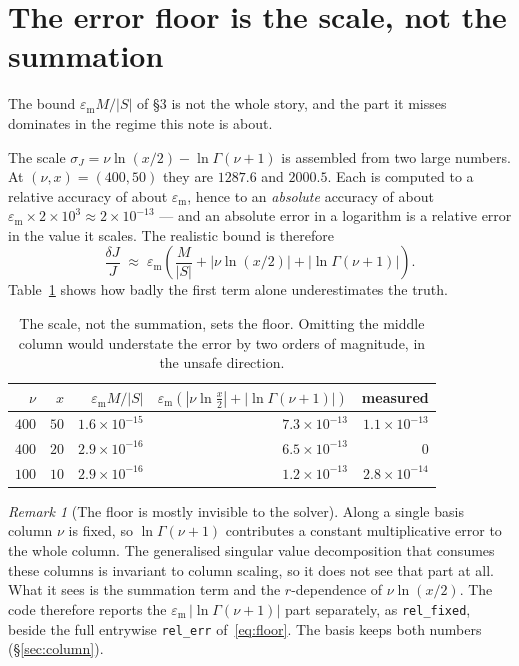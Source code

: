 \documentclass[11pt]{article}
\theoremstyle{remark}
\newtheorem{remark}{Remark}
\newcommand{\code}[1]{\texttt{#1}}
\newcommand{\eps}{\varepsilon_{\mathrm{m}}}
\begin{document}
\section{The error floor is the scale, not the summation}
\label{sec:floor}

The bound $\eps M/|S|$ of \S3 is not the whole story, and the part it misses dominates in the
regime this note is about.

The scale $\sigma_J=\nu\ln(x/2)-\ln\Gamma(\nu+1)$ is assembled from two large numbers. At
$(\nu,x)=(400,50)$ they are $1287.6$ and $2000.5$. Each is computed to a relative accuracy of
about $\eps$, hence to an \emph{absolute} accuracy of about $\eps\times 2\times10^{3}\approx
2\times10^{-13}$ --- and an absolute error in a logarithm is a relative error in the value it
scales. The realistic bound is therefore
\begin{equation}
  \frac{\delta J}{J} \;\approx\; \eps\left(\frac{M}{|S|}
    + \big|\nu\ln(x/2)\big| + \big|\ln\Gamma(\nu+1)\big|\right).
  \label{eq:floor}
\end{equation}
Table~\ref{tab:floor} shows how badly the first term alone underestimates the truth.

\begin{table}[h]
\centering
\begin{tabular}{rrrrr}
\toprule
$\nu$ & $x$ & $\eps M/|S|$ & $\eps(|\nu\ln\frac{x}{2}|+|\ln\Gamma(\nu+1)|)$ & measured\\
\midrule
$400$ & $50$ & $1.6\times10^{-15}$ & $7.3\times10^{-13}$ & $1.1\times10^{-13}$\\
$400$ & $20$ & $2.9\times10^{-16}$ & $6.5\times10^{-13}$ & $0$\\
$100$ & $10$ & $2.9\times10^{-16}$ & $1.2\times10^{-13}$ & $2.8\times10^{-14}$\\
\bottomrule
\end{tabular}
\caption{The scale, not the summation, sets the floor. Omitting the middle column would
understate the error by two orders of magnitude, in the unsafe direction.}
\label{tab:floor}
\end{table}

\begin{remark}[The floor is mostly invisible to the solver]
Along a single basis column $\nu$ is fixed, so $\ln\Gamma(\nu+1)$ contributes a constant
multiplicative error to the whole column. The generalised singular value decomposition that
consumes these columns is invariant to column scaling, so it does not see that part at all.
What it sees is the summation term and the $r$-dependence of $\nu\ln(x/2)$. The code therefore
reports the $\eps\,|\ln\Gamma(\nu+1)|$ part separately, as \code{rel\_fixed}, beside the full
entrywise \code{rel\_err} of~\eqref{eq:floor}. The basis keeps both numbers
(\S\ref{sec:column}).
\end{remark}
\end{document}
